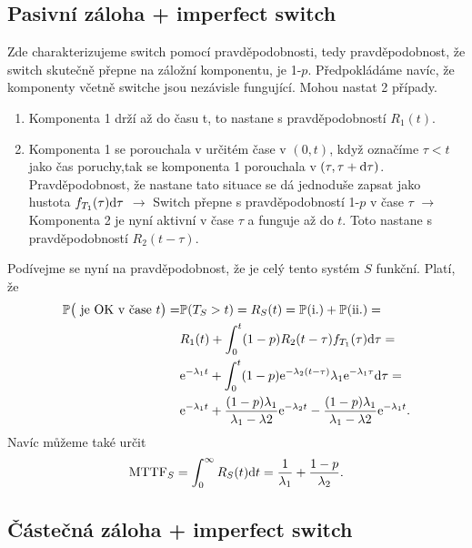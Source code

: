     \subsection*{Pasivní záloha + imperfect switch}
        Zde charakterizujeme switch pomocí pravděpodobnosti, tedy pravděpodobnost, že switch skutečně přepne na záložní komponentu, je 1-$p$. 
        Předpokládáme navíc, že komponenty včetně switche jsou nezávisle fungující. Mohou nastat 2 případy.
            \begin{enumerate}
                \item Komponenta 1 drží až do času t, to nastane s pravděpodobností $R_1(t)$.
                \item Komponenta 1 se porouchala v určitém čase v $(0,t)$, když označíme $\tau < t$ jako čas poruchy,tak se komponenta 1 porouchala v $(\tau,\tau + \mathrm{d}\tau)$. Pravděpodobnost, že nastane tato situace se dá jednoduše zapsat jako hustota $f_{T_1}(\tau)\mathrm{d}\tau$ $\longrightarrow$ Switch přepne s pravděpodobností 1-$p$ v čase $\tau$ $\longrightarrow$ Komponenta 2 je nyní aktivní v čase $\tau$ a funguje až do $t$. Toto nastane s pravděpodobností $R_2(t-\tau)$.
            \end{enumerate}
    Podívejme se nyní na pravděpodobnost, že je celý tento systém $S$ funkční. Platí, že
    \begin{align*}
        \mathbb{P}\big(\text{ je OK v čase }t \big) =  & \mathbb{P}(T_S > t ) = R_S(t) = \mathbb{P}(\mathrm{i.}) + \mathbb{P}(\mathrm{ii.}) = \\ &
        R_1(t) + \int_0^t (1-p)R_2(t-\tau) f_{T_1}(\tau)\mathrm{d}\tau = \\ &
        \mathrm{e}^{-\lambda_1 t} + \int_0^t (1-p)\mathrm{e}^{-\lambda_2 (t-\tau)} \lambda_1\mathrm{e}^{-\lambda_1 \tau}  \mathrm{d}\tau = \\ &
        \mathrm{e}^{-\lambda_1 t} + \frac{(1-p)\lambda_1}{\lambda_1-\lambda2}\mathrm{e}^{-\lambda_2 t} - \frac{(1-p)\lambda_1}{\lambda_1-\lambda2}\mathrm{e}^{-\lambda_1 t}.
    \end{align*}
    Navíc můžeme také určit 
    \begin{align*}
        \mathrm{MTTF}_S = \int_0^{\infty} R_S(t) \mathrm{d} t = \frac{1}{\lambda_1} + \frac{1-p}{\lambda_2}.
    \end{align*}

    \subsection*{Částečná záloha + imperfect switch}
    
